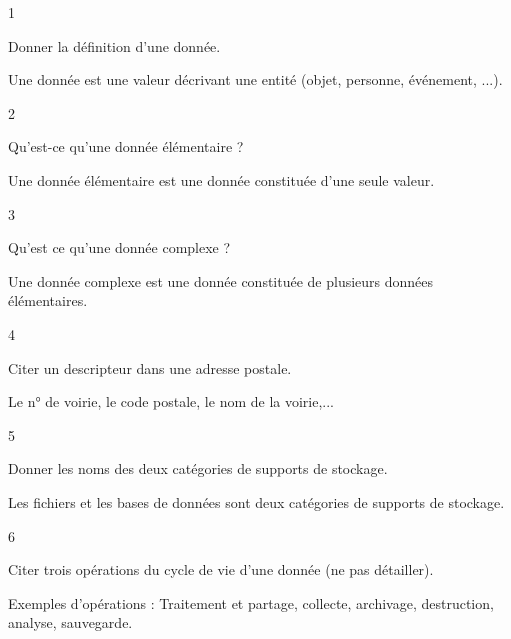 
\begin{taggedblock}{1}
\begin{exoq}
Donner la définition d'une donnée.
\end{exoq} 
\begin{exor}
Une donnée est une valeur décrivant une entité (objet, personne, événement, ...). \bqr
\end{exor} 
\end{taggedblock}

\begin{taggedblock}{2}
\begin{exoq}
Qu'est-ce qu'une donnée élémentaire ?
\end{exoq} 
\begin{exor}
Une donnée élémentaire est une donnée constituée d'une seule valeur. \bqr
\end{exor} 
\end{taggedblock}

\begin{taggedblock}{3}
\begin{exoq}
Qu'est ce qu'une donnée complexe ?
\end{exoq} 
\begin{exor}
Une donnée complexe est une donnée constituée de plusieurs données élémentaires. \bqr
\end{exor} 
\end{taggedblock}

\begin{taggedblock}{4}
\begin{exoq}
Citer un descripteur dans une adresse postale.
\end{exoq} 
\begin{exor}
Le n° de voirie, le code postale, le nom de la voirie,... \bqr
\end{exor} 
\end{taggedblock}

\begin{taggedblock}{5}
\begin{exoq}
Donner les noms des deux catégories de supports de stockage.
\end{exoq} 
\begin{exor}
Les fichiers et les bases de données sont deux catégories de supports de stockage. \bqr
\end{exor} 
\end{taggedblock}

\begin{taggedblock}{6}
\begin{exoq}
Citer trois opérations du cycle de vie d'une donnée (ne pas détailler).
\end{exoq} 
\begin{exor}
Exemples d'opérations : Traitement et partage, collecte, archivage, destruction, analyse, sauvegarde. \bqr
\end{exor} 
\end{taggedblock}

